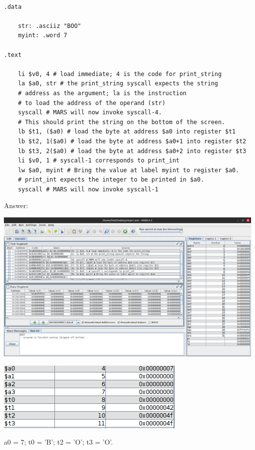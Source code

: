 \documentclass{article}
\begin{document}
\begin{lstlisting}[language={[x86masm]Assembler}]

.data

    str: .asciiz "BOO"
    myint: .word 7

.text

    li $v0, 4 # load immediate; 4 is the code for print_string
    la $a0, str # the print_string syscall expects the string
    # address as the argument; la is the instruction
    # to load the address of the operand (str)
    syscall # MARS will now invoke syscall-4.
    # This should print the string on the bottom of the screen.
    lb $t1, ($a0) # load the byte at address $a0 into register $t1
    lb $t2, 1($a0) # load the byte at address $a0+1 into register $t2
    lb $t3, 2($a0) # load the byte at address $a0+2 into register $t3
    li $v0, 1 # syscall-1 corresponds to print_int
    lw $a0, myint # Bring the value at label myint to register $a0.
    # print_int expects the integer to be printed in $a0.
    syscall # MARS will now invoke syscall-1 

\end{lstlisting}


Answer:

\includegraphics[width=\linewidth]{execution_output}

\includegraphics[width=\linewidth]{register_values}

a0 = 7; t0 = 'B'; t2 = 'O'; t3 = 'O'.
\end{document}
